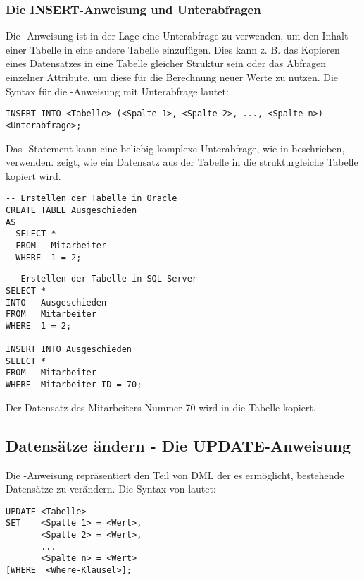         \subsubsection{Die INSERT-Anweisung und Unterabfragen}
          Die \INSERT-Anweisung ist in der Lage eine Unterabfrage zu verwenden,
          um den Inhalt einer Tabelle in eine andere Tabelle einzufügen. Dies
          kann z. B. das Kopieren eines Datensatzes in eine Tabelle gleicher
          Struktur sein oder das Abfragen einzelner Attribute, um diese für
          die Berechnung neuer Werte zu nutzen. Die Syntax für die
          \INSERT-Anweisung mit Unterabfrage lautet:
          \begin{lstlisting}[language=oracle_sql,caption={Die \INSERT-Anweisung mit Unterabfrage},label=sql07_07]
INSERT INTO <Tabelle> (<Spalte 1>, <Spalte 2>, ..., <Spalte n>)
<Unterabfrage>;
          \end{lstlisting}
          Das \INSERT-Statement kann eine beliebig komplexe Unterabfrage, wie in
           beschrieben, verwenden. 
          zeigt, wie ein Datensatz aus der Tabelle  in
          die strukturgleiche Tabelle  kopiert wird.
          \begin{lstlisting}[language=oracle_sql,caption={Die \INSERT-Anweisung
      mit Unterabfrage},label=sql07_08]
-- Erstellen der Tabelle in Oracle
CREATE TABLE Ausgeschieden
AS
  SELECT *
  FROM   Mitarbeiter
  WHERE  1 = 2;
          \end{lstlisting}
\clearpage
          \begin{lstlisting}[language=oracle_sql]
-- Erstellen der Tabelle in SQL Server
SELECT *
INTO   Ausgeschieden
FROM   Mitarbeiter
WHERE  1 = 2;

INSERT INTO Ausgeschieden
SELECT *
FROM   Mitarbeiter
WHERE  Mitarbeiter_ID = 70;
          \end{lstlisting}
          Der Datensatz des Mitarbeiters Nummer 70 wird in die Tabelle
           kopiert.
      \subsection{Datensätze ändern - Die UPDATE-Anweisung}
        Die \UPDATE-Anweisung repräsentiert den Teil von DML der es
        ermöglicht, bestehende Datensätze zu verändern. Die Syntax von
        \UPDATE{} lautet:
        \begin{lstlisting}[language=oracle_sql,caption={Die Syntax des \UPDATE-Kommandos},label=sql07_09]
UPDATE <Tabelle>
SET    <Spalte 1> = <Wert>,
       <Spalte 2> = <Wert>,
       ...
       <Spalte n> = <Wert>
[WHERE  <Where-Klausel>];
        \end{lstlisting}


